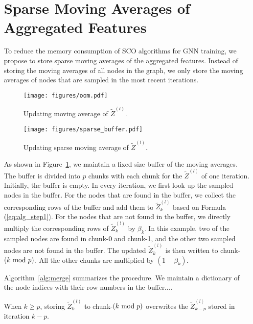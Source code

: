 \section{Sparse Moving Averages of Aggregated Features}
To reduce the memory consumption of SCO algorithms for GNN training, we propose to store sparse moving averages of the aggregated features. 
Instead of storing the moving averages of all nodes in the graph, we only store the moving averages of nodes that are sampled in the most recent iterations. 

\begin{figure}
  \begin{minipage}{.44\linewidth}
    \centering
  \texttt{[image: figures/oom.pdf]}
  \caption{Updating moving average of $\widetilde{Z}^{(l)}$.}
  \label{fig:oom}
\end{minipage} 
\hfill
\begin{minipage}{.52\linewidth}
  \centering
    \texttt{[image: figures/sparse\_buffer.pdf]}
    \caption{Updating sparse moving average of $\widetilde{Z}^{(l)}$.}
    \label{fig:sparse_buffer}
\end{minipage}
\end{figure}
As shown in Figure~\ref{fig:sparse_buffer}, we maintain a fixed size buffer of the moving averages. 
The buffer is divided into $p$ chunks with each chunk for the $\widetilde{Z}^{(l)}$ of one iteration. 
Initially, the buffer is empty. 
In every iteration, we first look up the sampled nodes in the buffer. 
For the nodes that are found in the buffer, we collect the corresponding rows of the buffer and add them to $\widetilde{Z}_k^{(l)}$ based on Formula (\ref{eq:alg_step1}). 
For the nodes that are not found in the buffer, we directly multiply the corresponding rows of $\widetilde{Z}_k^{(l)}$ by $\beta_k$. 
In this example, two of the sampled nodes are found in chunk-0 and chunk-1, and the other two sampled nodes are not found in the buffer. 
The updated $\widetilde{Z}_k^{(l)}$ is then written to chunk-$(k\ \mathrm{mod}\ p)$.  
All the other chunks are multiplied by $(1-\beta_k)$. 

Algorithm~\ref{alg:merge} summarizes the procedure. 
We maintain a dictionary of the node indices with their row numbers in the buffer....




When $k\ge p$, storing $\widetilde{Z}_k^{(l)}$ to chunk-$(k\ \mathrm{mod}\ p)$ overwrites the $\widetilde{Z}_{k-p}^{(l)}$ stored in iteration $k-p$. 






